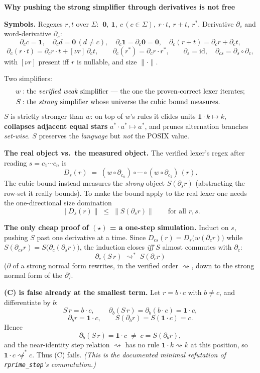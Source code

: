 \documentclass[11pt]{article}
\newcommand{\der}{\partial}
\newcommand{\sz}[1]{\lVert #1\rVert}
\newcommand{\nl}{\nu}
\newcommand{\rw}{\rightsquigarrow}
\newcommand{\one}{\mathbf{1}}
\newcommand{\zero}{\mathbf{0}}
\begin{document}
\begin{center}\large\bfseries Why pushing the strong simplifier through derivatives is not free\end{center}

\textbf{Symbols.}
Regexes $r,t$ over $\Sigma$: $\ \zero,\ \one,\ c\,(c\in\Sigma),\ r\!\cdot\! t,\ r{+}t,\ r^{*}$.
Derivative $\der_c$ and word-derivative $\der_s$:
\[
\der_c c=\one,\quad \der_c d=\zero\,(d\neq c),\quad \der_c\one=\der_c\zero=\zero,\quad
\der_c(r{+}t)=\der_c r+\der_c t,
\]
\[
\der_c(r\!\cdot\! t)=\der_c r\!\cdot\! t+[\nl r]\,\der_c t,\qquad
\der_c(r^{*})=\der_c r\!\cdot\! r^{*},\qquad
\der_\varepsilon=\mathrm{id},\quad \der_{cs}=\der_s\circ\der_c,
\]
with $[\nl r]$ present iff $r$ is nullable, and size $\sz{\cdot}$.

Two simplifiers:
\[
\begin{aligned}
w &: \text{the \emph{verified weak} simplifier — the one the proven-correct lexer iterates;}\\
S &: \text{the \emph{strong} simplifier whose universe the cubic bound measures.}
\end{aligned}
\]
$S$ is strictly stronger than $w$: on top of $w$'s rules it elides units $\one\!\cdot\! k\mapsto k$,
\textbf{collapses adjacent equal stars} $a^{*}\!\cdot\! a^{*}\mapsto a^{*}$, and prunes alternation branches
\emph{set-wise}. $S$ preserves the \emph{language} but \emph{not} the POSIX value.

\textbf{The real object vs.\ the measured object.}
The verified lexer's regex after reading $s=c_1\cdots c_n$ is
\[
D_s(r)\;=\;(w\circ\der_{c_n})\circ\cdots\circ(w\circ\der_{c_1})\,(r).
\]
The cubic bound instead measures the \emph{strong} object $S(\der_s r)$ (abstracting the row-set it really bounds).
To make the bound apply to the real lexer one needs the one-directional size domination
\[
\boxed{\;\sz{D_s(r)}\;\le\;\sz{S(\der_s r)}\qquad\text{for all }r,s.\;}\tag{$\star$}
\]

\textbf{The only cheap proof of $(\star)$ = a one-step simulation.}
Induct on $s$, pushing $S$ past one derivative at a time. Since
$D_{cs}(r)=D_s\!\big(w(\der_c r)\big)$ while $S(\der_{cs}r)=S\!\big(\der_c(\der_s r)\big)$,
the induction closes \emph{iff} $S$ almost commutes with $\der_c$:
\[
\der_c(S\,r)\;\rw^{*}\;S(\der_c r)\tag{C}
\]
($\der$ of a strong normal form rewrites, in the verified order $\rw$, down to the strong normal form of the $\der$).

\textbf{(C) is false already at the smallest term.}
Let $r=b\!\cdot\! c$ with $b\neq c$, and differentiate by $b$:
\[
S\,r=b\!\cdot\! c,\qquad \der_b(S\,r)=\der_b(b\!\cdot\! c)=\one\!\cdot\! c,
\]
\[
\der_b r=\one\!\cdot\! c,\qquad S(\der_b r)=S(\one\!\cdot\! c)=c.
\]
Hence
\[
\der_b(S\,r)=\one\!\cdot\! c\;\neq\;c=S(\der_b r),
\]
and the near-identity step relation $\rw$ has no rule $\one\!\cdot\! k\rw k$ at this position, so $\one\!\cdot\! c\not\rw^{*}c$.
Thus (C) fails. \emph{(This is the documented minimal refutation of \texttt{rprime\_step}'s commutation.)}
\end{document}
